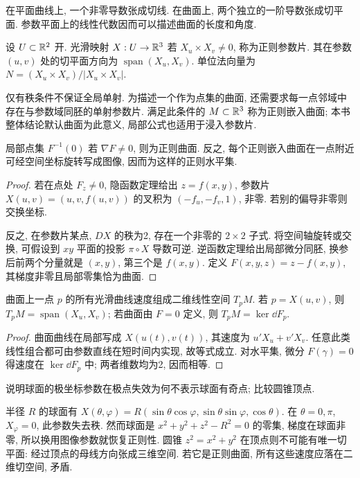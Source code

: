 在平面曲线上, 一个非零导数张成切线. 在曲面上, 两个独立的一阶导数张成切平面. 参数平面上的线性代数因而可以描述曲面的长度和角度.
\begin{definition}
设 $U\subset\mathbb R^2$ 开. 光滑映射 $X:U\to\mathbb R^3$ 若 $X_u\times X_v\ne0$, 称为正则参数片. 其在参数 $(u,v)$ 处的切平面方向为 $\operatorname{span}(X_u,X_v)$. 单位法向量为 $N=(X_u\times X_v)/|X_u\times X_v|$.
\end{definition}
仅有秩条件不保证全局单射. 为描述一个作为点集的曲面, 还需要求每一点邻域中存在与参数域同胚的单射参数片. 满足此条件的 $M\subset\mathbb R^3$ 称为正则嵌入曲面; 本书整体结论默认曲面为此意义, 局部公式也适用于浸入参数片.
\begin{proposition}\label{prop:implicit}
局部点集 $F^{-1}(0)$ 若 $\nabla F\ne0$, 则为正则曲面. 反之, 每个正则嵌入曲面在一点附近可经空间坐标旋转写成图像, 因而为这样的正则水平集.
\end{proposition}
\begin{proof}
若在点处 $F_z\ne0$, 隐函数定理给出 $z=f(x,y)$, 参数片 $X(u,v)=(u,v,f(u,v))$ 的叉积为 $(-f_u,-f_v,1)$, 非零. 若别的偏导非零则交换坐标.

反之, 在参数片某点, $DX$ 的秩为2, 存在一个非零的 $2\times2$ 子式. 将空间轴旋转或交换, 可假设到 $xy$ 平面的投影 $\pi\circ X$ 导数可逆. 逆函数定理给出局部微分同胚, 换参后前两个分量就是 $(x,y)$, 第三个是 $f(x,y)$. 定义 $F(x,y,z)=z-f(x,y)$, 其梯度非零且局部零集恰为曲面.
\end{proof}
\begin{proposition}
曲面上一点 $p$ 的所有光滑曲线速度组成二维线性空间 $T_pM$. 若 $p=X(u,v)$, 则 $T_pM=\operatorname{span}(X_u,X_v)$; 若曲面由 $F=0$ 定义, 则 $T_pM=\ker\dd F_p$.
\end{proposition}
\begin{proof}
曲面曲线在局部写成 $X(u(t),v(t))$, 其速度为 $u'X_u+v'X_v$. 任意此类线性组合都可由参数直线在短时间内实现, 故等式成立. 对水平集, 微分 $F(\gamma)=0$ 得速度在 $\ker\dd F_p$ 中; 两者维数均为2, 因而相等.
\end{proof}
\begin{example}
说明球面的极坐标参数在极点失效为何不表示球面有奇点; 比较圆锥顶点.
\end{example}
\begin{solution}
半径 $R$ 的球面有 $X(\theta,\varphi)=R(\sin\theta\cos\varphi,\sin\theta\sin\varphi,\cos\theta)$. 在 $\theta=0,\pi$, $X_\varphi=0$, 此参数失去秩. 然而球面是 $x^2+y^2+z^2-R^2=0$ 的零集, 梯度在球面非零, 所以换用图像参数就恢复正则性. 圆锥 $z^2=x^2+y^2$ 在顶点则不可能有唯一切平面: 经过顶点的母线方向张成三维空间. 若它是正则曲面, 所有这些速度应落在二维切空间, 矛盾.
\end{solution}
